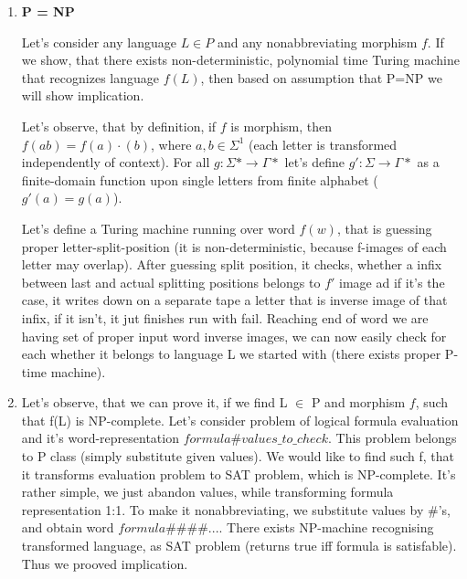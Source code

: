 \documentclass[12pt]{article}
\begin{document}
\begin{enumerate}
    \item \textbf{P = NP \Rightarrow {}}
    
        Let's consider any language $L \in P$ and any nonabbreviating morphism $f$. If we show, that there exists non-deterministic, polynomial time Turing machine that recognizes language $f(L)$, then based on assumption that P=NP we will show implication.
        
        Let's observe, that by definition, if $f$ is morphism, then $f(ab)= f(a)\cdot(b)$, where $a, b \in \Sigma^{1}$ (each letter is transformed independently of context). 
        For all $g\colon\Sigma\ast\to\Gamma\ast$ let's define $g'\colon\Sigma\to\Gamma\ast$ as a finite-domain function upon single letters from finite alphabet ($g'(a)=g(a)$).
        
        Let's define a Turing machine running over word $f(w)$, that is guessing proper letter-split-position (it is non-deterministic, because f-images of each letter may overlap). After guessing split position, it checks, whether a infix between last and actual splitting positions belongs to $f'$ image
        ad if it's the case, it writes down on a separate tape a letter that is inverse image of that infix, if it isn't, it jut finishes run with fail.
        Reaching end of word we are having set of proper input  word inverse images, we can now easily check for each whether it belongs to language L we started with (there exists proper P-time machine).
        
    \item \textbf{ \Rightarrow  {}}
    
        Let's observe, that we can prove it, if we find L $\in$ P and morphism $f$, such that f(L) is NP-complete. Let's consider problem of logical formula evaluation and it's word-representation $formula\#values\_to\_check$. This problem belongs to P class (simply substitute given values). We would like to find such f, that it transforms evaluation problem to SAT problem, which is NP-complete. It's rather simple, we just abandon values, while transforming formula representation 1:1. To make it nonabbreviating, we substitute values by $\#$'s, and obtain word $formula\#\#\#\#...$. There exists NP-machine recognising transformed language, as SAT problem (returns true iff formula is satisfable). Thus we prooved implication.
\end{enumerate}
\end{document}
